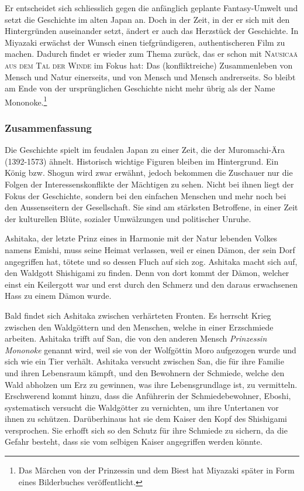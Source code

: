 Er entscheidet sich schliesslich gegen die anfänglich geplante Fantasy-Umwelt und setzt die Geschichte im alten Japan an. Doch in der Zeit, in der er sich mit den Hintergründen auseinander setzt, ändert er auch das Herzstück der Geschichte. In Miyazaki erwächst der Wunsch einen tiefgründigeren, authen\-tischeren Film zu machen. Dadurch findet er wieder zum Thema zurück, das er schon mit \textsc{Nausicaä aus dem Tal der Winde} im Fokus hat: Das (kon\-fliktreiche) Zusammenleben von Mensch und Natur einerseits, und von Mensch und Mensch andrerseits. So bleibt am Ende von der ursprünglichen Geschichte nicht mehr übrig als der Name Mononoke.\footnote{Das Märchen von der Prinzessin und dem Biest hat Miyazaki später in Form eines Bilderbuches veröffentlicht.}

\subsubsection{Zusammenfassung}
Die Geschichte spielt im feudalen Japan zu einer Zeit, die der Muromachi-Ära (1392-1573) ähnelt. Historisch wichtige Figuren bleiben im Hintergrund. Ein König bzw. Shogun wird zwar erwähnt, jedoch bekommen die Zuschauer nur die Folgen der Interessenskonflikte der Mächtigen zu sehen. Nicht bei ihnen liegt der Fokus der Geschichte, sondern bei den einfachen Menschen und mehr noch bei den Aussenseitern der Gesellschaft. Sie sind am stärksten Betroffene, in einer Zeit der kulturellen Blüte, sozialer Umwälzungen und politischer Unruhe. 

Ashitaka, der letzte Prinz eines in Harmonie mit der Natur lebenden Volkes namens Emishi, muss seine Heimat verlassen, weil er einen Dämon, der sein Dorf angegriffen hat, tötete und so dessen Fluch auf sich zog. Ashitaka macht sich auf, den Waldgott Shishigami zu finden. Denn von dort kommt der Dämon, welcher einst ein Keilergott war und erst durch den Schmerz und den daraus erwachsenen Hass zu einem Dämon wurde. 

Bald findet sich Ashitaka zwischen verhärteten Fronten. Es herrscht Krieg zwischen den Waldgöttern und den Menschen, welche in einer Erzschmiede arbeiten. Ashitaka trifft auf San, die von den anderen Mensch \emph{Prinzessin Mononoke} genannt wird, weil sie von der Wolfgöttin Moro aufgezogen wurde und sich wie ein Tier verhält. Ashitaka versucht zwischen San, die für ihre Familie und ihren Lebensraum kämpft, und den Bewohnern der Schmiede, welche den Wald abholzen um Erz zu gewinnen, was ihre Lebensgrundlage ist, zu vermitteln. Erschwerend kommt hinzu, dass die Anführerin der Schmiedebewohner, Eboshi, systematisch versucht die Waldgötter zu vernichten, um ihre Untertanen vor ihnen zu schützen. Darüberhinaus hat sie dem Kaiser den Kopf des Shishigami versprochen. Sie erhofft sich so den Schutz für ihre Schmiede zu sichern, da die Gefahr besteht, dass sie vom selbigen Kaiser angegriffen werden könnte. 

